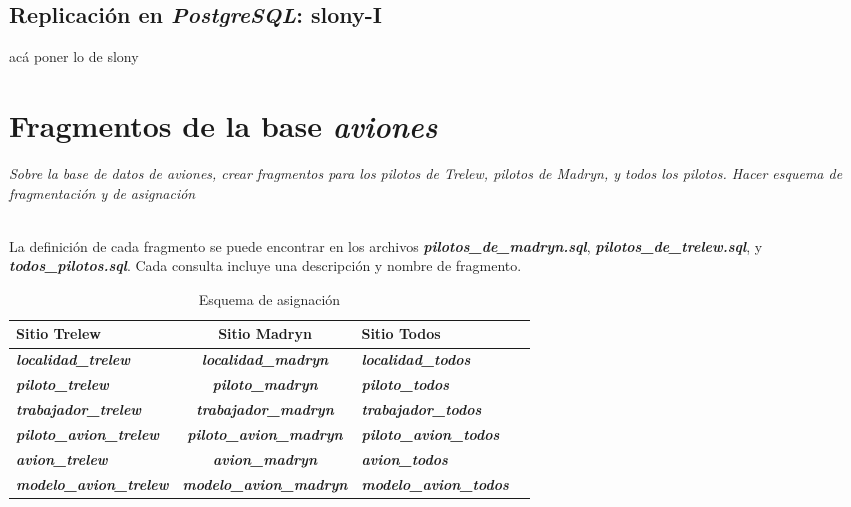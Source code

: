\subsection{Replicación en \emph{PostgreSQL}: slony-I}
acá poner lo de slony


\section{Fragmentos de la base \emph{aviones}}
\emph{Sobre la base de datos de aviones, crear fragmentos para los pilotos de Trelew, pilotos de Madryn, y todos los pilotos. Hacer esquema de fragmentación y de asignación} 

~\\

La definición de cada fragmento se puede encontrar en los archivos \textbf{\emph{pilotos\_de\_madryn.sql}}, \textbf{\emph{pilotos\_de\_trelew.sql}}, y \textbf{\emph{todos\_pilotos.sql}}. Cada consulta incluye una descripción y nombre de fragmento.

\begin{center}
    \begin{table}[H]
        \begin{tabular}{| p{5cm} | c | p{5cm} | p{4cm} |}
            \hline
            Sitio Trelew & Sitio Madryn & Sitio Todos\\ \hline
            \textbf{\emph{localidad\_trelew}} & \textbf{\emph{localidad\_madryn}} & \textbf{\emph{localidad\_todos}}\\ \hline
            \textbf{\emph{piloto\_trelew}} & \textbf{\emph{piloto\_madryn}} & \textbf{\emph{piloto\_todos}}\\ \hline
            \textbf{\emph{trabajador\_trelew}} & \textbf{\emph{trabajador\_madryn}} & \textbf{\emph{trabajador\_todos}}\\ \hline
            \textbf{\emph{piloto\_avion\_trelew}} & \textbf{\emph{piloto\_avion\_madryn}} & \textbf{\emph{piloto\_avion\_todos}}\\ \hline
            \textbf{\emph{avion\_trelew}} & \textbf{\emph{avion\_madryn}} & \textbf{\emph{avion\_todos}}\\ \hline
            \textbf{\emph{modelo\_avion\_trelew}} & \textbf{\emph{modelo\_avion\_madryn}} & \textbf{\emph{modelo\_avion\_todos}}\\ \hline
        \end{tabular}
    \caption{\label{tab:table-name}Esquema de asignación}
    \end{table}
\end{center}


